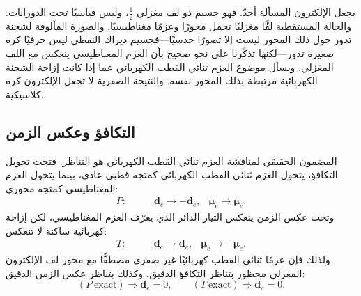 يجعل الإلكترون المسألة أحدّ. فهو جسيم ذو لف مغزلي \(\tfrac12\)، وليس قياسيًا تحت الدورانات. والحالة المستقطبة لفًّا مغزليًا تحمل محورًا وعزمًا مغناطيسيًا. والصورة المألوفة لشحنة تدور حول ذلك المحور ليست إلا تصورًا حدسيًا---فجسيم ديراك النقطي ليس حرفيًا كرة صغيرة تدور---لكنها تذكّرنا على نحو صحيح بأن العزم المغناطيسي ينعكس مع اللف المغزلي. ويسأل موضوع العزم ثنائي القطب الكهربائي عما إذا كانت إزاحة الشحنة الكهربائية مرتبطة بذلك المحور نفسه. والنتيجة الصفرية لا تجعل الإلكترون كرة كلاسيكية.

\begin{classroomqa}\end{classroomqa}

\begin{classroomqa}\end{classroomqa}

\subsection{التكافؤ وعكس الزمن}

المضمون الحقيقي لمناقشة العزم ثنائي القطب الكهربائي هو التناظر. فتحت تحويل التكافؤ، يتحول العزم ثنائي القطب الكهربائي كمتجه قطبي عادي، بينما يتحول العزم المغناطيسي كمتجه محوري: \begin{align}
P:\qquad &\mathbf d_e \to -\mathbf d_e,
&\boldsymbol{\mu}_e \to \boldsymbol{\mu}_e .
\end{align} وتحت عكس الزمن ينعكس التيار الدائر الذي يعرّف العزم المغناطيسي، لكن إزاحة كهربائية ساكنة لا تنعكس: \begin{align}
T:\qquad &\mathbf d_e \to \mathbf d_e,
&\boldsymbol{\mu}_e \to -\boldsymbol{\mu}_e .
\end{align} ولذلك فإن عزمًا ثنائي القطب كهربائيًا غير صفري مصطفًّا مع محور لف الإلكترون المغزلي محظور بتناظر التكافؤ الدقيق، وكذلك بتناظر عكس الزمن الدقيق: \begin{equation}
(P\ \text{exact}) \Rightarrow \mathbf d_e=0,
\qquad
(T\ \text{exact}) \Rightarrow \mathbf d_e=0.
\end{equation}

